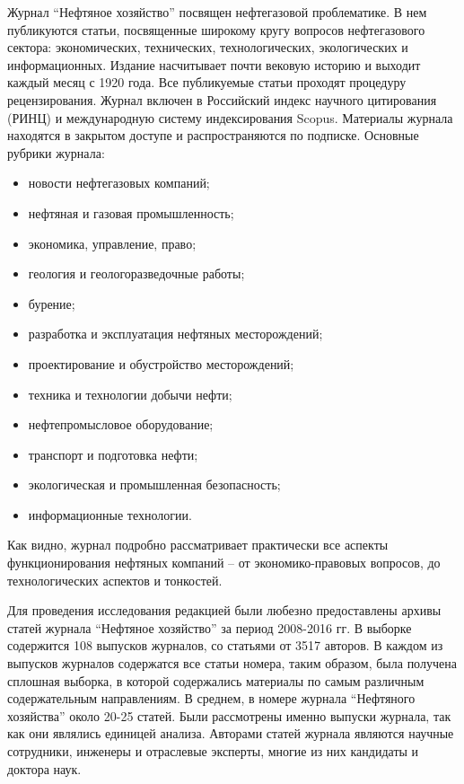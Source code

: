 Журнал ``Нефтяное хозяйство'' посвящен нефтегазовой проблематике.
В нем публикуются статьи, посвященные широкому кругу вопросов нефтегазового сектора: экономических, технических, технологических, экологических и информационных. Издание насчитывает почти вековую историю и выходит каждый месяц с 1920 года. 
Все публикуемые статьи проходят процедуру рецензирования.
Журнал включен в Российский индекс научного цитирования (РИНЦ) и международную систему индексирования Scopus. 
Материалы журнала находятся в закрытом доступе и распространяются по подписке. 
Основные рубрики журнала: 

\begin{itemize}
\tightlist
\item новости нефтегазовых компаний;
\item нефтяная и газовая промышленность;
\item экономика, управление, право;
\item геология и геологоразведочные работы;
\item бурение;
\item разработка и эксплуатация нефтяных месторождений;
\item проектирование и обустройство месторождений;
\item техника и технологии добычи нефти;
\item нефтепромысловое оборудование;
\item транспорт и подготовка нефти;
\item экологическая и промышленная безопасность;
\item информационные технологии. 
\end{itemize}

Как видно, журнал подробно рассматривает практически все аспекты функционирования нефтяных компаний – от экономико-правовых вопросов, до технологических аспектов и тонкостей.

Для проведения исследования редакцией были любезно предоставлены архивы статей журнала ``Нефтяное хозяйство'' за период 2008-2016 гг. 
В выборке содержится 108 выпусков журналов, со статьями от 3517 авторов. 
В каждом из выпусков журналов содержатся все статьи номера, таким образом, была получена сплошная выборка, в которой содержались материалы по самым различным содержательным направлениям. 
В среднем, в номере журнала ``Нефтяного хозяйства'' около 20-25 статей. 
Были рассмотрены именно выпуски журнала, так как они являлись единицей анализа. 
Авторами статей журнала являются научные сотрудники, инженеры и отраслевые эксперты, многие из них кандидаты и доктора наук. 

